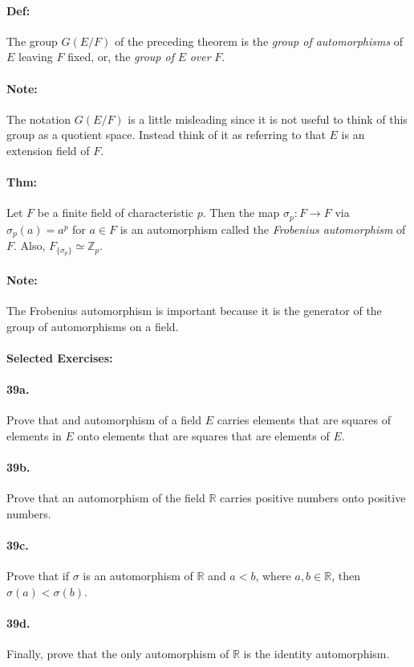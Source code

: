 \documentclass[10pt,a4paper]{article}
\begin{document}
\paragraph{Def:} The group $G(E/F)$ of the preceding theorem is the \textit{group of automorphisms} of $E$ leaving $F$ fixed, or, the \textit{group of} $E$ \textit{over} $F$.

\paragraph{Note:} The notation $G(E/F)$ is a little misleading since it is not useful to think of this group as a quotient space. Instead think of it as referring to that $E$ is an extension field of $F$.

\paragraph{Thm:}  Let $F$ be a finite field of characteristic $p$. Then the map $\sigma_p:F \to F$ via $\sigma_p(a) = a^p$ for $a \in F$ is an automorphism called the \textit{Frobenius automorphism} of $F$. Also, $F_{\{\sigma_p\}} \simeq \mathbb{Z}_p$.

\paragraph{Note:} The Frobenius automorphism is important because it is the generator of the group of automorphisms on a field.

\paragraph{Selected Exercises:}

\paragraph{39a.} Prove that and automorphism  of a field $E$ carries elements that are squares of elements in $E$ onto elements that are squares that are elements of $E$.

\paragraph{39b.} Prove that an automorphism of the field $\mathbb{R}$ carries positive numbers onto positive numbers.

\paragraph{39c.} Prove that if $\sigma$ is an automorphism of $\mathbb{R}$ and $a <b$, where $a,b \in \mathbb{R}$, then $\sigma(a) < \sigma(b)$.

\paragraph{39d.} Finally, prove that the only automorphism of $\mathbb{R}$ is the identity automorphism.
\end{document}
